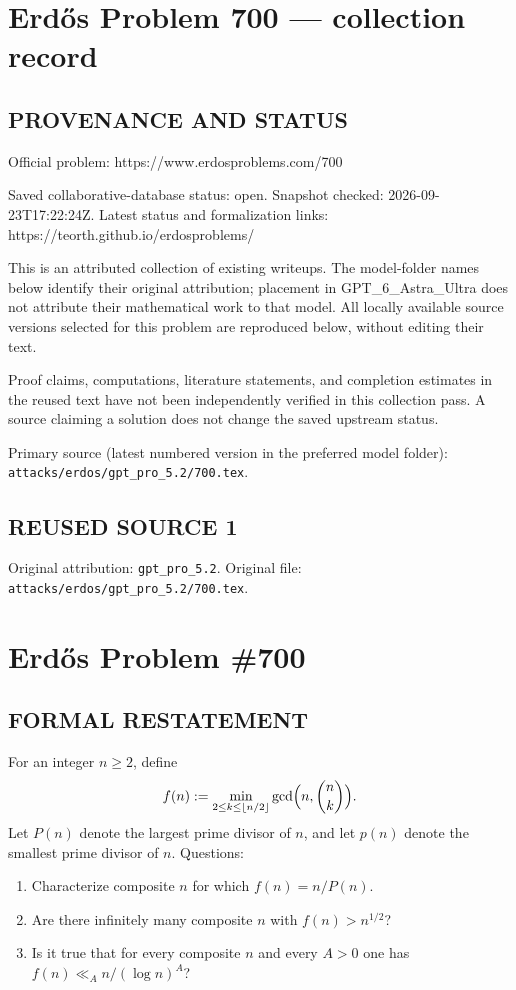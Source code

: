 \section*{Erd\H{o}s Problem 700 --- collection record}

\subsection*{PROVENANCE AND STATUS}
Official problem: https://www.erdosproblems.com/700

Saved collaborative-database status: open.
Snapshot checked: 2026-09-23T17:22:24Z.
Latest status and formalization links: https://teorth.github.io/erdosproblems/

This is an attributed collection of existing writeups. The model-folder names below identify their original attribution; placement in GPT\_6\_Astra\_Ultra does not attribute their mathematical work to that model. All locally available source versions selected for this problem are reproduced below, without editing their text.

Proof claims, computations, literature statements, and completion estimates in the reused text have not been independently verified in this collection pass. A source claiming a solution does not change the saved upstream status.

Primary source (latest numbered version in the preferred model folder): \texttt{attacks/erdos/gpt\_pro\_5.2/700.tex}.

\subsection*{REUSED SOURCE 1}
Original attribution: \texttt{gpt\_pro\_5.2}.
Original file: \texttt{attacks/erdos/gpt\_pro\_5.2/700.tex}.

\section*{Erd\H{o}s Problem \#700}

\subsection*{FORMAL RESTATEMENT}
For an integer $n\ge 2$, define
\[f(n) := \min_{2\le k\le \lfloor n/2\rfloor}\gcd\Bigl(n,\binom{n}{k}\Bigr).
\]
Let $P(n)$ denote the largest prime divisor of $n$, and let $p(n)$ denote the smallest prime divisor of $n$.
Questions:
\begin{enumerate}
\item Characterize composite $n$ for which $f(n)=n/P(n)$.
\item Are there infinitely many composite $n$ with $f(n)>n^{1/2}$?
\item Is it true that for every composite $n$ and every $A>0$ one has $f(n)\ll_A n/(\log n)^A$?
\end{enumerate}

